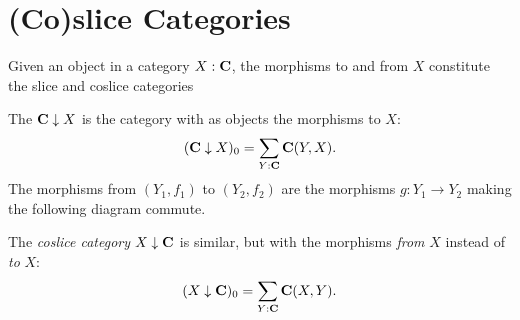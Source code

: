 \section{(Co)slice Categories}
Given an object in a category $ X: \mathbf{C} $, the morphisms to and from $ X $ constitute the slice and coslice categories
\begin{definition}
  The  $ \mathbf{C} \downarrow X $ is the category with as objects the morphisms to $ X $:
  \[ (\mathbf{C} \downarrow X)_0 = \sum_{Y: \mathbf{C}} \mathbf{C}(Y, X). \]
  The morphisms from $ (Y_1, f_1) $ to $ (Y_2, f_2) $ are the morphisms $ g: Y_1 \to Y_2 $ making the following diagram commute.
  \begin{center}
  \end{center}
\end{definition}
The \textit{coslice category} $ X \downarrow \mathbf{C} $ is similar, but with the morphisms \textit{from} $ X $ instead of \textit{to} $ X $:
\[ (X \downarrow \mathbf{C})_0 = \sum_{Y: \mathbf{C}} \mathbf{C}(X, Y). \]


